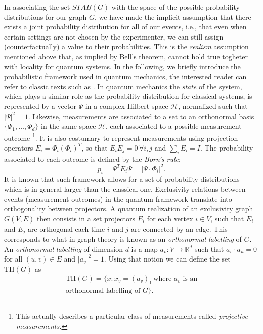 \documentclass[letterpaper]{article}
\newcommand{\abs}[1]{\left|#1\right|}
\newcommand{\Real}{\mathbb{R}}
\renewcommand{\TH}{\mathrm{TH}}
\begin{document}
In associating the set $STAB(G)$ with the space of the possible
probability distributions for our graph $G$, we have made the implicit
assumption that there exists a joint probability distribution for all
of our events, i.e., that even when certain settings are not chosen
by the experimenter, we can still assign (counterfactually) a value to
their probabilities.  This is the \emph{realism} assumption mentioned
above that, as implied by Bell's theorem, cannot hold true togheter with
locality for quantum systems.  In the following, we briefly introduce the
probabilistic framework used in quantum mechanics, the interested reader
can refer to classic texts such as \cite{nielsen_chuang}.  In quantum
mechanics the \emph{state} of the system, which plays a similar role
as the probability distribution for classical systems, is represented
by a vector $\Psi$ in a complex Hilbert space $\mathcal{H}$, normalized such
that $\abs{\Psi}^2 = 1$. Likewise, measurements are associated to a
set to an orthonormal basis $\{\Phi_1,\ldots,\Phi_d\}$ in the same
space $\mathcal{H}$, each associated to a possible measurement outcome
\footnote{This actually describes a particular class of measurements
called \emph{projective measurements.}}. It is also costumary to
represent measurements using projection operators $E_i = \Phi_i
(\Phi_i)^T$, so that $E_i E_j = 0 \, \forall i,j$ and $\sum_i E_i =
I$. The probability associated to each outcome is defined by the
\emph{Born's rule}:
\begin{equation}
    p_i = \Psi^T E_i \Psi = \abs{\Psi \cdot \Phi_i}^2.
\end{equation}
It is known that such framework allows for a set of probability
distributions which is in general larger than the classical one.
Exclusivity relations between events (measurement outcomes) in the
quantum framework translate into orthogonality between projectors.
A quantum realization of an exclusivity graph $G(V,E)$ then consists in a
set projectors $E_i$ for each vertex $i \in V$, such that $E_i$ and $E_j$
are orthogonal each time $i$ and $j$ are connected by an edge. This
corresponds to what in graph theory is known as an \emph{orthonormal
labelling} of $G$.
An \emph{orthonormal labelling} of dimension $d$ is a map $a_v:V
\rightarrow \Real^d$ such that $a_v \cdot a_u = 0$ for all $(u, v) \in E$
and $|a_v|^2 = 1$.
Using that notion we can define the set $\TH(G)$ as
\begin{multline}
    \TH(G) = \{x: x_v = (a_v)_1 \, \text{where $a_v$ is an} \\ \text{orthonormal labelling of $G$}\}.
    \label{eq:thbody}
\end{multline}
\end{document}
